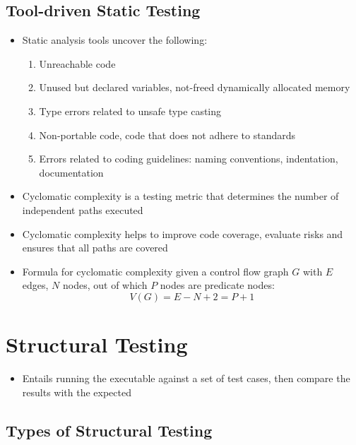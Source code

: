 \documentclass{article}
\begin{document}
\subsection{Tool-driven Static Testing}
\begin{itemize}
    \item Static analysis tools uncover the following:
    \begin{enumerate}
        \item Unreachable code
        
        \item Unused but declared variables, not-freed dynamically allocated memory
        
        \item Type errors related to unsafe type casting
        
        \item Non-portable code, code that does not adhere to standards
        
        \item Errors related to coding guidelines: naming conventions, indentation, documentation
    \end{enumerate}
    
    \item Cyclomatic complexity is a testing metric that determines the number of independent paths executed
    
    \item Cyclomatic complexity helps to improve code coverage, evaluate risks and ensures that all paths are covered
    
    \item Formula for cyclomatic complexity given a control flow graph $G$ with $E$ edges, $N$ nodes, out of which $P$ nodes are predicate nodes:
    \begin{equation*}
        V(G) = E - N + 2 = P  + 1
    \end{equation*}
\end{itemize}

\section{Structural Testing}
\begin{itemize}
    \item Entails running the executable against a set of test cases, then compare the results with the expected
\end{itemize}
\subsection{Types of Structural Testing}
\end{document}
